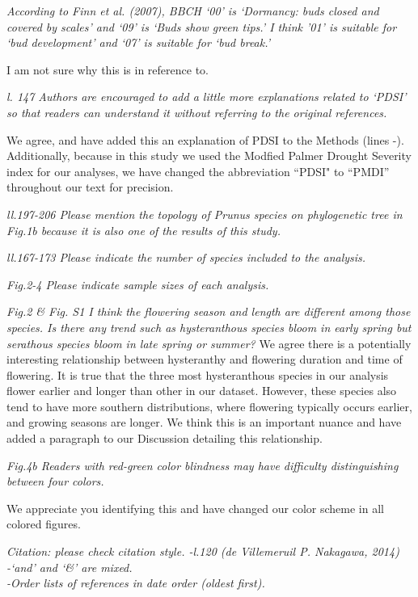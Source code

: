\documentclass{article}[12pt]
\begin{document}
\emph{According to Finn et al. (2007), BBCH ‘00’ is ‘Dormancy: buds closed and covered by scales’ and ‘09’ is ‘Buds show green tips.’ I think ’01’ is suitable for ‘bud development’ and ‘07’ is suitable for ‘bud break.’}

I am not sure why this is in reference to.

\emph{l. 147 Authors are encouraged to add a little more explanations related to ‘PDSI’ so that readers can understand it without referring to the original references.}

We agree, and have added this an explanation of PDSI to the Methods (lines -). Additionally, because in this study we used the Modfied Palmer Drought Severity index for our analyses, we have changed the abbreviation ``PDSI" to ``PMDI'' throughout our text for precision.

\emph{ll.197-206 Please mention the topology of Prunus species on phylogenetic tree in Fig.1b because it is also one of the results of this study.}

\emph{ll.167-173 Please indicate the number of species included to the analysis.}

\emph{Fig.2-4 Please indicate sample sizes of each analysis.}

\emph{Fig.2 & Fig. S1 I think the flowering season and length are different among those species. Is there any trend such as hysteranthous species bloom in early spring but serathous species bloom in late spring or summer?}
We agree there is a potentially interesting relationship between hysteranthy and flowering duration and time of flowering. It is true that the three most hysteranthous species in our analysis flower earlier and longer than other in our dataset. However, these species also tend to have more southern distributions, where flowering typically occurs earlier, and growing seasons are longer. We think this is an important nuance and have added a paragraph to our Discussion detailing this relationship.

\emph{Fig.4b Readers with red-green color blindness may have difficulty distinguishing between four colors.}

We appreciate you identifying this and have changed our color scheme in all colored figures.

\emph{Citation: please check citation style.
-l.120 (de Villemeruil P. Nakagawa, 2014)\\
-‘and’ and ‘&’ are mixed.\\
-Order lists of references in date order (oldest first).}
\end{document}
